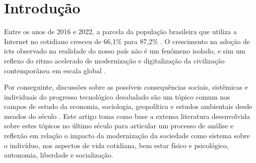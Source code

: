 \section{Introdução}

Entre os anos de 2016 e 2022, a parcela da população brasileira que utiliza a Internet no cotidiano cresceu de 66,1\%
para 87,2\% \cite{carmennery2024}. O crescimento na adoção de \gls{ict}s observado na realidade do nosso país não é um
fenômeno isolado, e sim um reflexo do ritmo acelerado de modernização e digitalização da civilização contemporânea em escala
global \cite{jeffburt2010}. 

Por conseguinte, discussões sobre as possíveis consequências sociais, sistêmicas e
individuais do progresso tecnológico desabalado são um tópico comum nos campos de estudo da economia, sociologia,
geopolítica e estudos ambientais desde meados do século  \cite{kaczynski1995,marcusekellner2001}. Este artigo toma como base a
extensa literatura desenvolvida sobre estes tópicos no último século para articular um processo de análise e reflexão
em relação o impacto da modernização da sociedade como sistema sobre o indivíduo, nos aspectos de vida cotidiana, bem
estar físico e psicológico, autonomia, liberdade e socialização.
